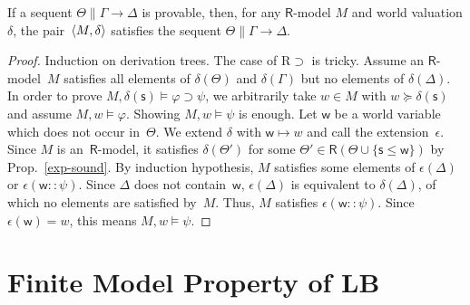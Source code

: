    \begin{lemma}
    \label{sound}
    If a sequent $\Theta\parallel \Gamma\longrightarrow \Delta$ is
    provable,
    then, for any $\mathsf R$-model $M$ and world valuation $\delta$,
    the pair~$\langle{M,\delta}\rangle$ satisfies the sequent $\Theta\parallel
    \Gamma\rightarrow\Delta$.
   \end{lemma}
   \begin{proof}
    Induction on derivation trees.
    The case of R$\supset$ is tricky.
    Assume an $\mathsf R$-model~$M$ satisfies all elements of
    $\delta(\Theta)$ and $\delta(\Gamma)$ but no elements of $\delta(\Delta)$.
    In order to prove $M,\delta(\mathsf s)\models\varphi\supset\psi$, we
    arbitrarily take $w\in M$ with $ w\succeq \delta(\mathsf s)$ and assume $M,
    w\models\varphi$.
    Showing $M,w\models\psi$ is enough.
    Let $\mathsf w$ be a world variable which does not occur in~$\Theta$.
    We extend $\delta$ with $\mathsf{w}\mapsto w$ and call the extension~$\epsilon$.
    Since $M$ is an~$\mathsf R$-model,
    it satisfies $\delta(\Theta')$ for some $\Theta'\in \mathsf R(\Theta\cup
    \{\mathsf s\le \mathsf w\})$ by Prop.~\ref{exp-sound}.
    By induction hypothesis, $M$ satisfies some elements of $\epsilon(\Delta)$ or
    $\epsilon(\mathsf w::\psi)$. Since $\Delta$ does not contain~$\mathsf w$,
    $\epsilon(\Delta)$ is equivalent to $\delta(\Delta)$, of which no elements are
    satisfied by~$M$.
    Thus, $M$ satisfies $\epsilon(\mathsf w::\psi)$.
    Since $\epsilon(\mathsf w) = w$, this means $M,  w\models\psi$.
   \end{proof}

  \section{Finite Model Property of LB}
  \label{fmplb}


